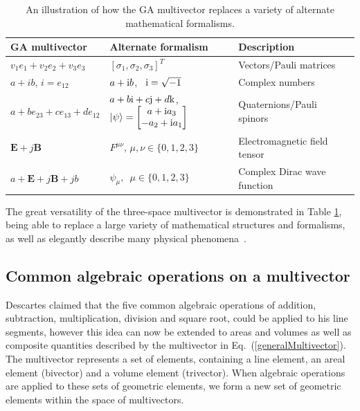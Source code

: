 \documentclass[prb,preprint]{revtex4}
\newcommand{\iGAT}{{i}}
\begin{document}
\begin{table}
	\centering

\begin{tabular}{|l|l|l|l|}
\hline
 GA multivector & Alternate formalism & Description   \\
\hline \hline
$ v_1 e_{1} + v_2 e_{2} + v_3 e_{3} $ & $ [ \sigma_1, \sigma_2, \sigma_3 ]^T $ &  Vectors/Pauli matrices  \\
$ a + \iGAT b $, $ \iGAT = e_{12} $ & $ a + {\rm{i}}  b $, $ \,\,\, {\rm{i}} = \sqrt{-1}$ & Complex numbers     \\
$ a + b e_{23} + c e_{13} + d e_{12} $ & $ a + b {\rm{i}} + c {\rm{j}} + d {\rm{k}}  $, $ | \psi \rangle = \begin{bmatrix} a + {\rm{i}} a_3  \\ -a_2 + {\rm{i}} a_1  \end{bmatrix} $ &  Quaternions/Pauli spinors  \\
$ \boldsymbol{E} + j \boldsymbol{B} $ & $ F^{\mu \nu },\, \mu,\nu \in \{0,1,2,3\} $  &  Electromagnetic field tensor     \\
$ a + \boldsymbol{E} + j \boldsymbol{B} + j b $ & $ \psi_{\mu}, \,\,\, \mu \in \{0,1,2,3\} $  &  Complex Dirac wave function   \\
 
\hline
\end{tabular}
\caption{An illustration of how the GA multivector replaces a variety of alternate mathematical formalisms. }    \label{tableFormalisms}
\end{table}





The great versatility of the three-space multivector is demonstrated in Table \ref{tableFormalisms}, being able to replace a large variety of mathematical structures and formalisms, as well as elegantly describe many physical phenomena~\cite{GA2}.

\subsection{Common algebraic operations on a multivector}

Descartes claimed that the five common algebraic operations of addition, subtraction, multiplication, division and square root, could be applied to his line segments, however this idea can now be extended to areas and volumes as well as composite quantities described by the multivector in Eq.~(\ref{generalMultivector}).  The multivector represents a set of elements, containing a line element, an areal element (bivector) and a volume element (trivector).  When algebraic operations are applied to these sets of geometric elements, we form a new set of geometric elements within the space of multivectors.
\end{document}
